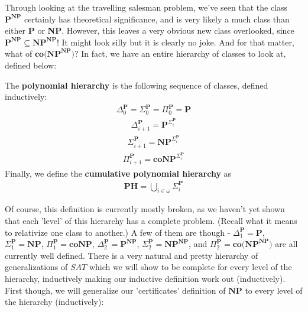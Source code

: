 \par Through looking at the travelling salesman problem, we've seen that the class $\textbf{P}^{\textbf{NP}}$ certainly has theoretical significance, and is very likely a much class than either \textbf{P} or \textbf{NP}. However, this leaves a very obvious new class overlooked, since $\textbf{P}^{\textbf{NP}} \subseteq \textbf{NP}^{\textbf{NP}}$! It might look silly but it is clearly no joke. And for that matter, what of $\textbf{co(NP}^{\textbf{NP}})$? In fact, we have an entire hierarchy of classes to look at, defined below:
\begin{definition}
    The \textbf{polynomial hierarchy} is the following sequence of classes, defined inductively:
    \begin{align}
            \Delta_0^{\textbf{P}} = \Sigma_0^{\textbf{P}} = \Pi_0^{\textbf{P}} = \textbf{P}
    \end{align}
    \begin{align}
         \Delta_{i+1}^{\textbf{P}} = \textbf{P}^{\Sigma_i^{\textbf{P}}}
    \end{align}
    \begin{align}
        \Sigma_{i+1}^{\textbf{P}} = \textbf{NP}^{\Sigma_i^{\textbf{P}}}
    \end{align}
    \begin{align}
        \Pi_{i+1}^{\textbf{P}} = \textbf{coNP}^{\Sigma_i^{\textbf{P}}}
    \end{align}
    Finally, we define the \textbf{cumulative polynomial hierarchy} as 
    \begin{align}
        \textbf{PH} = \bigcup_{i \in \omega} \Sigma_i^{\textbf{P}}    
    \end{align}
\end{definition}
Of course, this definition is currently mostly broken, as we haven't yet shown that each 'level' of this hierarchy has a complete problem. (Recall what it means to relativize one class to another.) A few of them are though - $\Delta_1^{\textbf{P}} = \textbf{P}$, $\Sigma_1^{\textbf{P}} = \textbf{NP}$, $\Pi_1^{\textbf{P}} = \textbf{coNP}$, $\Delta_2^{\textbf{P}} = \textbf{P}^{\textbf{NP}}$, $\Sigma_2^{\textbf{P}} = \textbf{NP}^{\textbf{NP}}$, and $\Pi_2^{\textbf{P}} = \textbf{co(NP}^{\textbf{NP}})$ are all currently well defined. There is a very natural and pretty hierarchy of generalizations of $SAT$ which we will show to be complete for every level of the hierarchy, inductively making our inductive definition work out (inductively). First though, we will generalize our 'certificates' definition of $\textbf{NP}$ to every level of the hierarchy (inductively):

